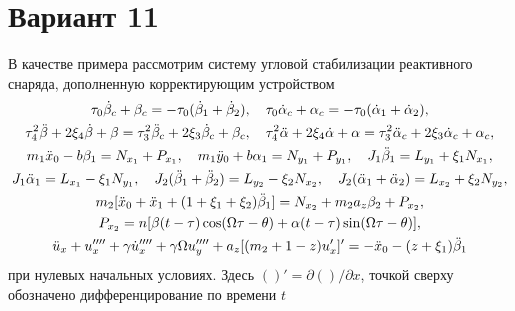 \documentclass{article}
\begin{document}
\section*{Вариант 11}

В качестве примера рассмотрим систему угловой стабилизации реактивного снаряда, дополненную корректирующим устройством
\begin{equation}
\raisetag{4\baselineskip}
\begin{gathered}
\tau_0\dot{\beta}_c + \beta_c = -\tau_0(\dot{\beta}_1 + \dot{\beta}_2), \quad
\tau_0\dot{\alpha}_c + \alpha_c = -\tau_0(\dot{\alpha}_1 + \dot{\alpha}_2), \\
\tau_4^2\ddot{\beta} + 2\xi_4\dot{\beta} + \beta = \tau_3^2\ddot{\beta}_c + 2\xi_3\dot{\beta}_c + \beta_c, \quad
\tau_4^2\ddot{\alpha} + 2\xi_4\dot{\alpha} + \alpha = \tau_3^2\ddot{\alpha}_c + 2\xi_3\dot{\alpha}_c + \alpha_c, \\
m_1\ddot{x}_0 - b\beta_1 = N_{x_1} + P_{x_1}, \quad
m_1\ddot{y}_0 + b\alpha_1 = N_{y_1} + P_{y_1}, \quad
J_1\ddot{\beta}_1 = L_{y_1} + \xi_1 N_{x_1}, \\
J_1\ddot{\alpha}_1 = L_{x_1} - \xi_1 N_{y_1}, \quad
J_2(\ddot{\beta}_1 + \ddot{\beta}_2) = L_{y_2} - \xi_2 N_{x_2}, \quad
J_2(\ddot{\alpha}_1 + \ddot{\alpha}_2) = L_{x_2} + \xi_2 N_{y_2}, \\
m_2[\ddot{x}_0 + \ddot{x}_1 + (1 + \xi_1 + \xi_2)\ddot{\beta}_1] = N_{x_2} + m_2 a_z \beta_2 + P_{x_2}, \\
P_{x_2} = n[\beta(t - \tau)\cos(\Omega\tau - \theta) + \alpha(t - \tau)\sin(\Omega\tau - \theta)], \\
\ddot{u}_x + u_x'''' + \gamma\dot{u}_x'''' + \gamma\Omega u_y'''' + a_z[(m_2 + 1 - z)u_x']' = -\ddot{x}_0 - (z + \xi_1)\ddot{\beta}_1
\end{gathered}
\end{equation}
при нулевых начальных условиях. Здесь $()' = \partial()/\partial x$, точкой сверху обозначено дифференцирование по времени $t$
\end{document}
